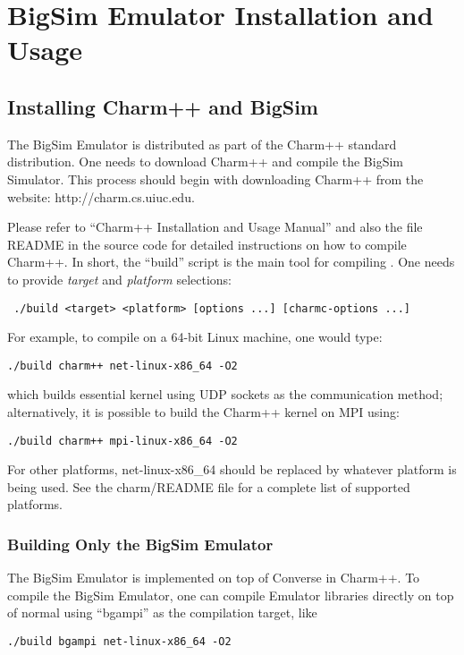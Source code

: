 \section{BigSim Emulator Installation and Usage}
\label{install}

\subsection{Installing Charm++ and BigSim}

    The BigSim Emulator is distributed as part of the Charm++ standard
distribution.  One needs to download Charm++ and compile the BigSim Simulator.
This process should begin with downloading Charm++ from the website:
http://charm.cs.uiuc.edu.

Please refer to ``Charm++ Installation and Usage Manual'' and also the file
README in the source code for detailed instructions on how to compile Charm++.
In short, the ``build'' script is the main tool for compiling \charmpp{}.  One
needs to provide {\em target} and {\em platform} selections: 
\begin{verbatim} ./build <target> <platform> [options ...] [charmc-options ...] \end{verbatim}

For example, to compile on a 64-bit Linux machine, one would type:
\begin{verbatim}
./build charm++ net-linux-x86_64 -O2
\end{verbatim}

\noindent which builds essential \charmpp{} kernel using UDP sockets as the
communication method; alternatively, it is possible to build the Charm++ kernel
on MPI using:
\begin{verbatim}
./build charm++ mpi-linux-x86_64 -O2
\end{verbatim}

For other platforms, net-linux-x86\_64 should be replaced by whatever platform is being used. 
See the charm/README file for a complete list of supported platforms.

\subsubsection{Building Only the BigSim Emulator}

The BigSim Emulator is implemented on top of Converse in Charm++.  To compile
the BigSim Emulator, one can compile Emulator libraries directly on top of
normal \charmpp{} using ``bgampi'' as the compilation target, like
\begin{verbatim}
./build bgampi net-linux-x86_64 -O2
\end{verbatim}

